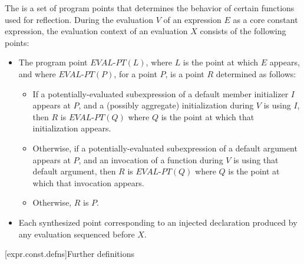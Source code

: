 \pnum
The  is a set of program points
that determines the behavior of certain functions
used for reflection.
During the evaluation $V$ of an expression $E$ as a core constant expression,
the evaluation context of an evaluation $X$
consists of the following points:
\begin{itemize}
\item
The program point $\textit{EVAL-PT}(L)$,
where $L$ is the point at which $E$ appears, and
where $\textit{EVAL-PT}(P)$, for a point $P$,
is a point $R$ determined as follows:
\begin{itemize}
\item
If a potentially-evaluated subexpression of
a default member initializer $I$ appears at $P$, and
a (possibly aggregate) initialization during $V$ is using $I$,
then $R$ is $\textit{EVAL-PT}(Q)$
where $Q$ is the point at which that initialization appears.
\item
Otherwise, if a potentially-evaluated subexpression of
a default argument appears at $P$, and
an invocation of a function during $V$
is using that default argument,
then $R$ is $\textit{EVAL-PT}(Q)$
where $Q$ is the point at which that invocation appears.
\item
Otherwise, $R$ is $P$.
\end{itemize}
\item
Each synthesized point corresponding to an injected declaration produced by
any evaluation sequenced before $X$.
\end{itemize}

[expr.const.defns]{Further definitions}

